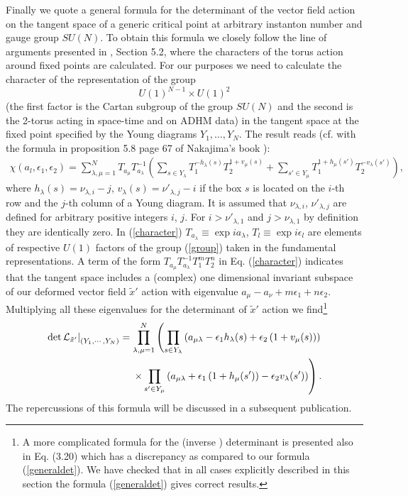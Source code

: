\documentclass[a4paper,12pt]{article}
\begin{document}
Finally we quote a general formula for the determinant of the
vector field action on the tangent space of a generic critical
point at arbitrary instanton number and gauge group $SU(N)$. To
obtain this formula we closely follow the line of arguments
presented in \cite{Nak}, Section 5.2, where the characters of the
torus action around fixed points are calculated. For our purposes
we need to calculate the character of the representation of the
group
\begin{equation}
U(1)^{N-1}\times U(1)^2 \label{group}
\end{equation}
(the first factor is the Cartan subgroup of the group $SU(N)$ and
the second is the 2-torus acting in space-time and on ADHM data)
in the tangent space at the fixed point specified by the Young
diagrams $Y_1, \dots, Y_N$. The result reads (cf. with the formula
in proposition 5.8 page 67 of Nakajima's book \cite{Nak}):
\begin{eqnarray}
\chi \left(a_l, \epsilon_1 , \epsilon_2\right)=\sum_{\lambda ,\mu
=1}^N T_{a_{\mu}} T_{a_{\lambda}}^{-1} \left(\sum_{s\in
Y_{\lambda}} T_1^{-h_{\lambda} (s)} T_2^{1+v_{\mu} (s)}+
\sum_{s'\in Y_{\mu}} T_1^{1+h_{\mu} (s')} T_2^{-v_{\lambda}
(s')}\right), \label{character}
\end{eqnarray}
where $h_{\lambda} (s)=\nu_{\lambda ,i} -j$, $v_{\lambda}
(s)=\nu'_{\lambda ,j} -i$ if the box $s$ is located on the $i$-th
row and the $j$-th column of a Young diagram. It is assumed that
$\nu_{\lambda ,i}$, $\nu'_{\lambda ,j}$ are defined for arbitrary
positive integers $i$, $j$. For $i > \nu'_{\lambda ,1}$ and $j>
\nu_{\lambda ,1}$ by definition they are identically zero. In
(\ref{character}) $T_{a_{\lambda}} \equiv \exp ia_{\lambda} $,
$T_{l} \equiv \exp i\epsilon_l$ are elements of respective $U(1)$
factors of the group (\ref{group}) taken in the fundamental
representations. A term of the form $T_{a_{\mu}}
T_{a_{\lambda}}^{-1} T_1^m T_2^n$ in Eq. (\ref{character})
indicates that the tangent space includes a (complex) one
dimensional invariant subspace of our deformed vector field
${\tilde x}'$ action with eigenvalue $a_{\mu}-a_{\nu}+m \epsilon_1
+n \epsilon_2$. Multiplying all these eigenvalues for the
determinant of ${\tilde x}'$ action we find\footnote{A more
complicated formula for the (inverse ) determinant is presented
also in \cite{N} Eq. (3.20) which has a discrepancy as compared to
our formula (\ref{generaldet}). We have checked that in all cases
explicitly described in this section the formula
(\ref{generaldet}) gives correct results.}
\begin{eqnarray}
\left. \det {\cal L}_{{\tilde x}'} \right|_{\left(Y_1, \cdots,
Y_N\right)}= \prod_{\lambda ,\mu =1}^N  \left( \prod_{s\in
Y_{\lambda}}\left( a_{\mu \lambda }-\epsilon_1 h_{\lambda
}(s)+\epsilon_2 \left(1+v_{\mu }(s)\right)\right)\right. \nonumber
\\ \left. \times \prod_{s'\in Y_{\mu}}\left( a_{\mu \lambda
}+\epsilon_1 \left(1+h_{\mu }(s')\right)-\epsilon_2 v_{\lambda
}(s')\right)\right). \label{generaldet}
\end{eqnarray}
The repercussions of this formula will be discussed in a
subsequent publication.
\end{document}
